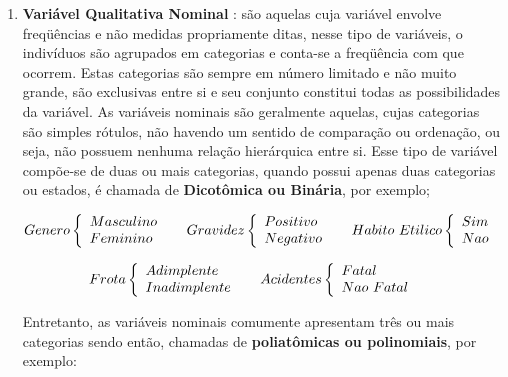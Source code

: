 \begin{enumerate}
\item \textbf{Variável Qualitativa Nominal} : são aquelas cuja variável envolve fre\-qüên\-cias e não medidas propriamente ditas, nesse tipo de variáveis, o indivíduos são agrupados em categorias e conta-se a freqüência com que ocorrem. Estas categorias são sempre em número limitado e não muito grande, são exclusivas entre si e seu conjunto constitui todas as possibilidades da variável. As variáveis nominais são geralmente aquelas, cujas categorias são simples rótulos, não havendo um sentido de comparação ou ordenação, ou seja, não possuem nenhuma relação hierárquica entre si. Esse tipo de variável compõe-se de duas ou mais categorias, quando possui apenas duas categorias ou estados, é chamada de \textbf{Dicotômica ou Binária}, por exemplo;


    $$
    Genero
    \left\{
    \begin{array}{ll}
    Masculino & \hbox{ } \\
    Feminino & \hbox{ }
    \end{array}
    \right.
  Gravidez
    \left\{
    \begin{array}{ll}
    Positivo & \hbox{ } \\
    Negativo & \hbox{ }
    \end{array}
    \right.
    Habito \ Etilico
    \left\{
    \begin{array}{ll}
    Sim & \hbox{ } \\
    Nao & \hbox{ }
    \end{array}
    \right.
    $$


    $$
    Frota
    \left\{
    \begin{array}{ll}
    Adimplente    & \hbox{ } \\
    Inadimplente  & \hbox{ }
    \end{array}
    \right.
     Acidentes
    \left\{
    \begin{array}{ll}
    Fatal     & \hbox{ } \\
    Nao \ Fatal & \hbox{ }
    \end{array}
    \right.
    $$


Entretanto, as variáveis nominais comumente apresentam três ou mais categorias sendo então, chamadas de \textbf{poliatômicas ou polinomiais}, por exemplo:



\end{enumerate}
